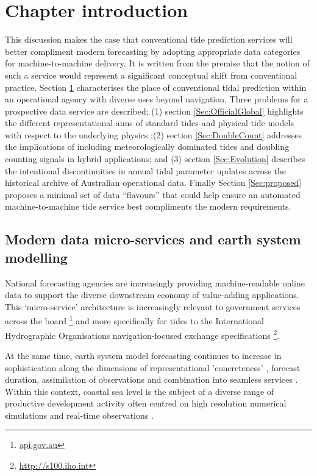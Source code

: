 \section{Chapter introduction}
\label{Sec:intro}
This discussion makes the case that conventional tide prediction services will better compliment modern forecasting by adopting appropriate data categories for machine-to-machine delivery.  It is written from the premise that the notion of such a service would represent a significant conceptual shift from conventional practice.  Section \ref{Sec:intro} characterises the place of conventional tidal prediction within an operational agency with diverse uses beyond navigation. Three problems for a prospective data service are described; (1) section \ref{Sec:OfficialGlobal} highlights the different representational aims of standard tides and physical tide models with respect to the underlying physics ;(2) section \ref{Sec:DoubleCount} addresses the implications of including meteorologically dominated tides and doubling counting signals in hybrid applications; and (3) section \ref{Sec:Evolution} describes the intentional discontinuities in annual tidal parameter updates across the historical archive of Australian operational data.   Finally Section \ref{Sec:proposed} proposes a minimal set of data ``flavours'' that could help ensure an automated machine-to-machine tide service best compliments the modern requirements. 


\subsection{Modern data micro-services and earth system modelling}
National forecasting agencies are increasingly providing machine-readable online data to support the diverse downstream economy of value-adding applications.
This `micro-service' architecture \citep{BCG2020} is increasingly relevant to government services across the board \footnote{\url{api.gov.au}} and more specifically for tides to the International Hydrographic Organisations navigation-focused exchange specifications \footnote{\url{http://s100.iho.int}}.

 
At the same time, earth system model forecasting continues to increase in sophistication along the dimensions of representational 'concreteness' \citep{Petersen:2012kp}, forecast duration, assimilation of observations and combination into seamless services \citep{BOM2020}.
Within this context, coastal sea level is the subject of a diverse range of productive development activity often centred on high resolution numerical simulations and real-time observations \citep{10.3389/fmars.2019.00437}. 


